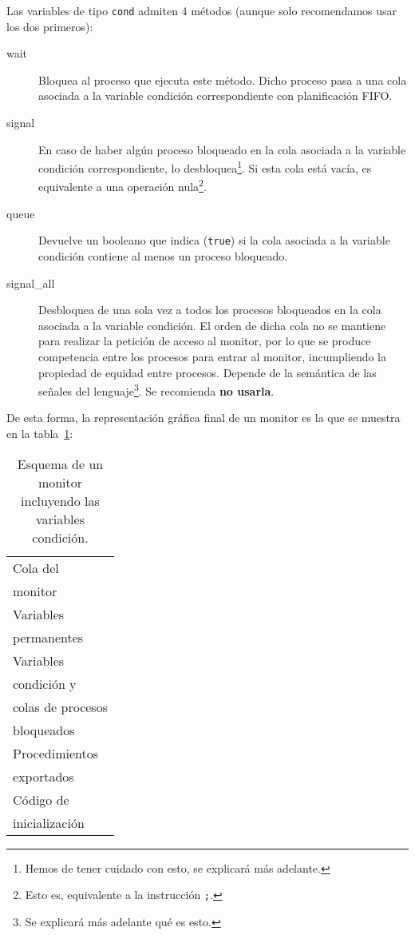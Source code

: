 Las variables de tipo \verb|cond| admiten 4 métodos (aunque solo recomendamos usar los dos primeros):
\begin{description}
    \item [wait] Bloquea al proceso que ejecuta este método. Dicho proceso pasa a una cola asociada a la variable condición correspondiente con planificación FIFO\@.
    \item [signal] En caso de haber algún proceso bloqueado en la cola asociada a la variable condición correspondiente, lo desbloquea\footnote{Hemos de tener cuidado con esto, se explicará más adelante.}. Si esta cola está vacía, es equivalente a una operación nula\footnote{Esto es, equivalente a la instrucción \texttt{;}.}.
    \item [queue] Devuelve un booleano que indica (\verb|true|) si la cola asociada a la variable condición contiene al menos un proceso bloqueado.
    \item [signal\_all] Desbloquea de una sola vez a todos los procesos bloqueados en la cola asociada a la variable condición. El orden de dicha cola no se mantiene para realizar la petición de acceso al monitor, por lo que se produce competencia entre los procesos para entrar al monitor, incumpliendo la propiedad de equidad entre procesos. Depende de la semántica de las señales del lenguaje\footnote{Se explicará más adelante qué es esto.}. Se recomienda \textbf{no usarla}.
\end{description}
De esta forma, la representación gráfica final de un monitor es la que se muestra en la tabla~\ref{esq:monitor_3}:
\begin{table}[H]
\centering
\begin{tabular}{|l|}
\hline
Cola del\\
monitor \\
\hline
Variables \\
permanentes \\
\hline
Variables \\
condición y\\
colas de procesos\\
bloqueados\\
\hline
Procedimientos \\
exportados \\
\hline
Código de \\ 
inicialización \\
\hline
\end{tabular}
\caption{Esquema de un monitor incluyendo las variables condición.}
\label{esq:monitor_3}
\end{table}

